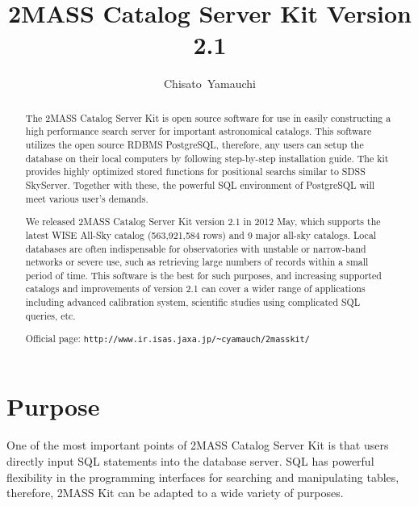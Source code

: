 
\resetcounters




\title{2MASS Catalog Server Kit Version 2.1}
\author{Chisato~Yamauchi
}


\begin{abstract}
The 2MASS Catalog Server Kit is open source software for use in easily constructing a high performance search server for important astronomical catalogs. This software utilizes the open source RDBMS PostgreSQL, therefore, any users can setup the database on their local computers by following step-by-step installation guide. The kit provides highly optimized stored functions for positional searchs similar to SDSS SkyServer. Together with these, the powerful SQL environment of PostgreSQL will meet various user's demands.

We released 2MASS Catalog Server Kit version 2.1 in 2012 May, which supports the latest WISE All-Sky catalog (563,921,584 rows) and 9 major all-sky catalogs. Local databases are often indispensable for observatories with unstable or narrow-band networks or severe use, such as retrieving large numbers of records within a small period of time. This software is the best for such purposes, and increasing supported catalogs and improvements of version 2.1 can cover a wider range of applications including advanced calibration system, scientific studies using complicated SQL queries, etc.

Official page: {\tt http://www.ir.isas.jaxa.jp/\~{}cyamauch/2masskit/}
\end{abstract}


\section{Purpose}

One of the most important points of 2MASS Catalog Server Kit \citep{yam_2011a} is that users directly input SQL statements into the database server. SQL has powerful flexibility in the programming interfaces for searching and manipulating tables, therefore, 2MASS Kit can be adapted to a wide variety of purposes.

